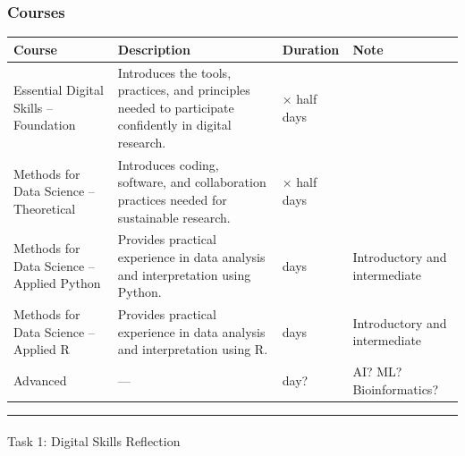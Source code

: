 \documentclass[
  letterpaper,
  DIV=11,
  numbers=noendperiod]{scrartcl}
\makeatletter
\let\oldparagraph\paragraph
\renewcommand{\paragraph}{
    \@ifstar
      \xxxParagraphStar
      \xxxParagraphNoStar
  }
\newcommand{\xxxParagraphStar}[1]{\oldparagraph*{#1}\mbox{}}
\newcommand{\xxxParagraphNoStar}[1]{\oldparagraph{#1}\mbox{}}
\makeatother
\begin{document}
\subsubsection{Courses}\label{courses}

\begin{longtable}[]{@{}
  >{\raggedright\arraybackslash}p{}
  >{\raggedright\arraybackslash}p{}
  >{\raggedright\arraybackslash}p{}
  >{\raggedright\arraybackslash}p{}@{}}
\toprule\noalign{}
\begin{minipage}[b]{\linewidth}\raggedright
Course
\end{minipage} & \begin{minipage}[b]{\linewidth}\raggedright
Description
\end{minipage} & \begin{minipage}[b]{\linewidth}\raggedright
Duration
\end{minipage} & \begin{minipage}[b]{\linewidth}\raggedright
Note
\end{minipage} \\
\midrule\noalign{}
\endhead
\bottomrule\noalign{}
\endlastfoot
Essential Digital Skills -- Foundation & Introduces the tools,
practices, and principles needed to participate confidently in digital
research. & 4× half days & \\
Methods for Data Science -- Theoretical & Introduces coding, software,
and collaboration practices needed for sustainable research. & 4× half
days & \\
Methods for Data Science -- Applied Python & Provides practical
experience in data analysis and interpretation using Python. & 2 days &
Introductory and intermediate \\
Methods for Data Science -- Applied R & Provides practical experience in
data analysis and interpretation using R. & 2 days & Introductory and
intermediate \\
Advanced & --- & 1 day? & AI? ML? Bioinformatics? \\
\end{longtable}

\begin{center}\rule{0.5\linewidth}{0.5pt}\end{center}

\paragraph{Task 1: Digital Skills
Reflection}\label{task-1-digital-skills-reflection}
\end{document}

